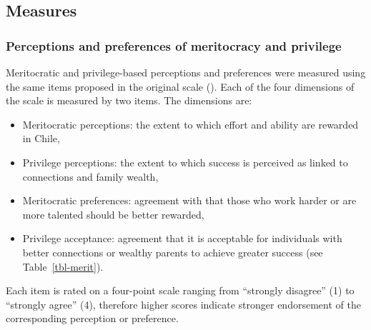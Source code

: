 \documentclass[
  13pt,
]{article}
\begin{document}
\subsection{Measures}\label{measures}

\subsubsection{Perceptions and preferences of meritocracy and
privilege}\label{perceptions-and-preferences-of-meritocracy-and-privilege}

Meritocratic and privilege-based perceptions and preferences were
measured using the same items proposed in the original scale
().
Each of the four dimensions of the scale is measured by two items. The
dimensions are:

\begin{itemize}
\item
  Meritocratic perceptions: the extent to which effort and ability are
  rewarded in Chile,
\item
  Privilege perceptions: the extent to which success is perceived as
  linked to connections and family wealth,
\item
  Meritocratic preferences: agreement with that those who work harder or
  are more talented should be better rewarded,
\item
  Privilege acceptance: agreement that it is acceptable for individuals
  with better connections or wealthy parents to achieve greater success
  (see Table~\ref{tbl-merit}).
\end{itemize}

Each item is rated on a four-point scale ranging from ``strongly
disagree'' (1) to ``strongly agree'' (4), therefore higher scores
indicate stronger endorsement of the corresponding perception or
preference.
\end{document}
